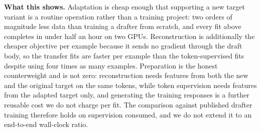 \textbf{What this shows.} Adaptation is cheap enough that supporting a new target variant is a routine operation rather than a training project: two orders of magnitude less data than training a drafter from scratch, and every fit above completes in under half an hour on two GPUs. Reconstruction is additionally the cheaper objective per example because it sends no gradient through the draft body, so the transfer fits are faster per example than the token-supervised fits despite using four times as many examples. Preparation is the honest counterweight and is not zero: reconstruction needs features from both the new and the original target on the same tokens, while token supervision needs features from the adapted target only, and generating the training responses is a further reusable cost we do not charge per fit. The comparison against published drafter training therefore holds on supervision consumed, and we do not extend it to an end-to-end wall-clock ratio.
